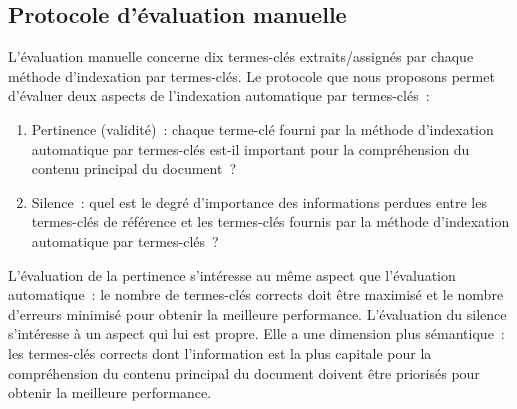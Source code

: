     \subsection{Protocole d'évaluation manuelle}
    \label{subsec:main-automatic_evaluation_of_keyphrase_annotation-methodology-evaluation_protocol}
      L'évaluation manuelle concerne dix termes-clés extraits/assignés par
      chaque méthode d'indexation par termes-clés. Le protocole que nous
      proposons permet d'évaluer deux aspects de l'indexation automatique par
      termes-clés~:
      \begin{enumerate}
        \item{Pertinence (validité)~: chaque terme-clé fourni par la méthode
              d'indexation automatique par termes-clés est-il important pour la
              compréhension du contenu principal du document~?}
        \item{Silence~: quel est le degré d'importance des informations perdues
              entre les termes-clés de référence et les termes-clés fournis par
              la méthode d'indexation automatique par termes-clés~?}
      \end{enumerate}
      L'évaluation de la pertinence s'intéresse au même aspect que l'évaluation
      automatique~: le nombre de termes-clés corrects doit être maximisé et le
      nombre d'erreurs minimisé pour obtenir la meilleure performance.
      L'évaluation du silence s'intéresse à un aspect qui lui est propre. Elle a
      une dimension plus sémantique~: les termes-clés corrects dont
      l'information est la plus capitale pour la compréhension du contenu
      principal du document doivent être priorisés pour obtenir la meilleure
      performance.

